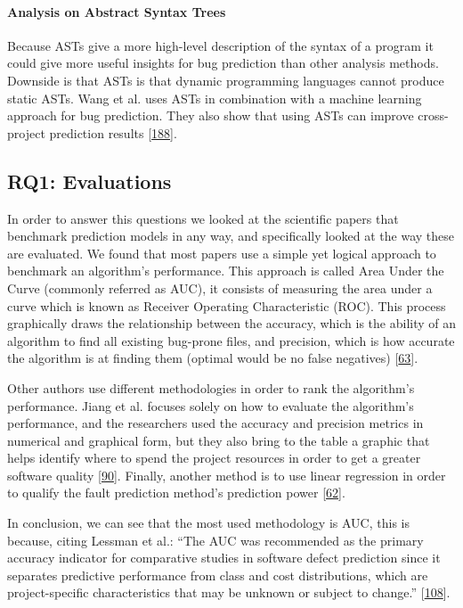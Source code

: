 \documentclass[]{book}
\let\oldparagraph\paragraph
\renewcommand{\paragraph}[1]{\oldparagraph{#1}\mbox{}}
\begin{document}
\paragraph{Analysis on Abstract Syntax
Trees}\label{analysis-on-abstract-syntax-trees}

Because ASTs give a more high-level description of the syntax of a
program it could give more useful insights for bug prediction than other
analysis methods. Downside is that ASTs is that dynamic programming
languages cannot produce static ASTs. Wang et al. uses ASTs in
combination with a machine learning approach for bug prediction. They
also show that using ASTs can improve cross-project prediction results
{[}\protect\hyperlink{ref-wang2016}{188}{]}.

\subsection{RQ1: Evaluations}\label{rq1-evaluations}

In order to answer this questions we looked at the scientific papers
that benchmark prediction models in any way, and specifically looked at
the way these are evaluated. We found that most papers use a simple yet
logical approach to benchmark an algorithm's performance. This approach
is called Area Under the Curve (commonly referred as AUC), it consists
of measuring the area under a curve which is known as Receiver Operating
Characteristic (ROC). This process graphically draws the relationship
between the accuracy, which is the ability of an algorithm to find all
existing bug-prone files, and precision, which is how accurate the
algorithm is at finding them (optimal would be no false negatives)
{[}\protect\hyperlink{ref-DAmbros2012}{63}{]}.

Other authors use different methodologies in order to rank the
algorithm's performance. Jiang et al. focuses solely on how to evaluate
the algorithm's performance, and the researchers used the accuracy and
precision metrics in numerical and graphical form, but they also bring
to the table a graphic that helps identify where to spend the project
resources in order to get a greater software quality
{[}\protect\hyperlink{ref-Jiang2008}{90}{]}. Finally, another method is
to use linear regression in order to qualify the fault prediction
method's prediction power {[}\protect\hyperlink{ref-DAmbros2010}{62}{]}.

In conclusion, we can see that the most used methodology is AUC, this is
because, citing Lessman et al.: ``The AUC was recommended as the primary
accuracy indicator for comparative studies in software defect prediction
since it separates predictive performance from class and cost
distributions, which are project-specific characteristics that may be
unknown or subject to change.''
{[}\protect\hyperlink{ref-Lessman2008}{108}{]}.
\end{document}
